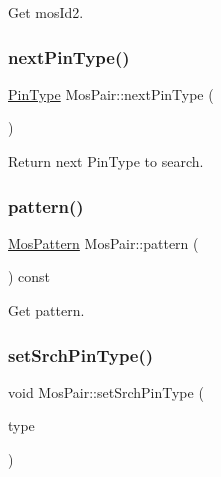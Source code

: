 Get mos\+Id2. 

\mbox{\label{classMosPair_a6c0bf6ad66a5076dc19a48a8d038d044}} 
\subsubsection{\texorpdfstring{next\+Pin\+Type()}{nextPinType()}}
{\footnotesize\ttfamily \hyperlink{type_8h_afaab50027002ecbb6c8ac27e727d1bb4}{Pin\+Type} Mos\+Pair\+::next\+Pin\+Type (\begin{DoxyParamCaption}{ }\end{DoxyParamCaption})\hspace{0.3cm}{\ttfamily [inline]}}



Return next Pin\+Type to search. 

\mbox{\label{classMosPair_a342efc591b339fc9d08ad468d7399dd9}} 
\subsubsection{\texorpdfstring{pattern()}{pattern()}}
{\footnotesize\ttfamily \hyperlink{type_8h_af19eddb079bfea723256710b029c38e8}{Mos\+Pattern} Mos\+Pair\+::pattern (\begin{DoxyParamCaption}{ }\end{DoxyParamCaption}) const\hspace{0.3cm}{\ttfamily [inline]}}



Get pattern. 

\mbox{\label{classMosPair_a133614566bf03ab4b37aced8169aee87}} 
\subsubsection{\texorpdfstring{set\+Srch\+Pin\+Type()}{setSrchPinType()}}
{\footnotesize\ttfamily void Mos\+Pair\+::set\+Srch\+Pin\+Type (\begin{DoxyParamCaption}\item[{\hyperlink{type_8h_afaab50027002ecbb6c8ac27e727d1bb4}{Pin\+Type}}]{type }\end{DoxyParamCaption})\hspace{0.3cm}{\ttfamily [inline]}}



